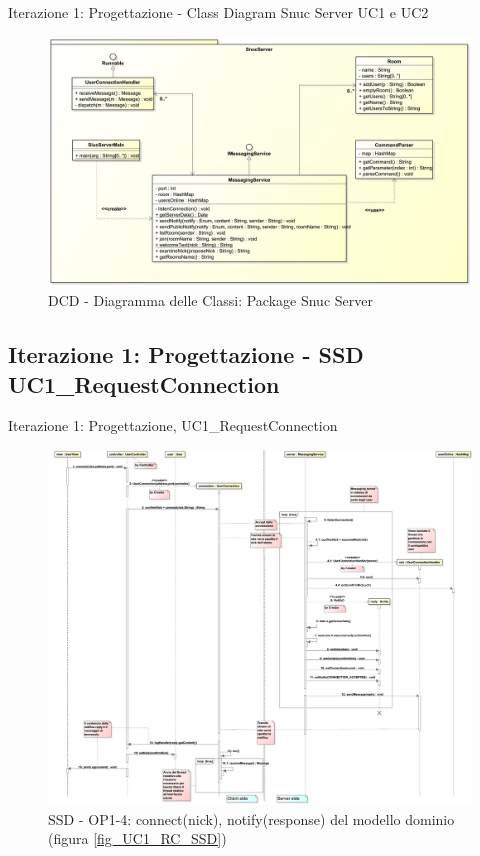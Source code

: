 \begin{frame} {Iterazione 1: Progettazione - Class Diagram Snuc Server UC1 e UC2}
   \begin{figure}
     \includegraphics[scale=0.156]{image_astah/Iteration_1_DesignModel/ClassDiagramSnucServer.png}{\centering}
     \caption{DCD - Diagramma delle Classi: Package Snuc Server }
     \label{fig_UC1_UC2_DCD_2} 
   \end{figure}
\end{frame}

\subsection{Iterazione 1: Progettazione - SSD  UC1\_RequestConnection}
\begin{frame} {Iterazione 1: Progettazione, UC1\_RequestConnection}
   \begin{figure}
     \includegraphics[scale=0.065]{image_astah/Iteration_1_DesignModel/UC1_RequestConnection_SSD_3_4_connect.png}{\centering}
     \caption{SSD - OP1-4: connect(nick), notify(response) del modello dominio (figura \ref{fig_UC1_RC_SSD}) }
     \label{fig_UC1_SSD_RC_1_4} 
   \end{figure}
\end{frame}


